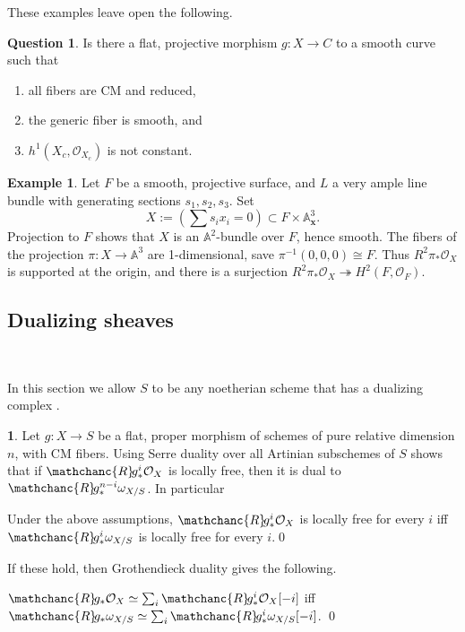 \documentclass{amsart}
\theoremstyle{definition}
\newtheorem{say}[thm]{}
\newtheorem{exmp}[thm]{Example}
\newtheorem{ques}[thm]{Question}    %
\theoremstyle{remark}
\renewcommand{\o}[0]{{\mathcal O}}
\renewcommand{\a}[0]{{\mathbb A}}
\newcommand{\onto}[0]{\twoheadrightarrow}
\newcommand{\tsum}[0]{\textstyle{\sum}}
\newcommand{\myR}{{\mathchanc{R}\!}}
\begin{document}
 
 These examples leave open the following.

 \begin{ques} Is there a flat, projective morphism
   $g:X\to C$ to a smooth curve such that
   \begin{enumerate}
   \item all fibers are  CM and reduced,
   \item the generic fiber is smooth, and
   \item  $h^1(X_c, \o_{X_c})$ is not constant.
   \end{enumerate}
   \end{ques}



 \begin{exmp}\label{h2.tor.exmp} Let $F$ be a smooth, projective surface, and $L$ a very ample line bundle with generating sections $s_1, s_2, s_3$.
   Set $$
   X:=(\tsum s_ix_i=0)\subset F\times \a^3_{\mathbf x}.
   $$
   Projection to $F$ shows that $X$ is an $\a^2$-bundle over $F$, hence smooth.   The fibers of the projection $\pi:X\to \a^3$ are 1-dimensional, save $\pi^{-1}(0,0,0)\cong F$.   Thus  $R^2\pi_*\o_X$ is supported at the origin, and there is a surjection $R^2\pi_*\o_X\onto H^2(F, \o_F)$.
 \end{exmp}






 \subsection*{Dualizing sheaves}{\ }
 \medskip


  In this section  we allow
 $S$ to be any noetherian scheme that has a dualizing complex
 \cite[\href{https://stacks.math.columbia.edu/tag/0A7B}{Tag
    0A7B}]{stacks-project}.


 \begin{say}\label{dual.elem.say}
   Let $g:X\to S$ be a flat, proper  morphism of schemes of pure relative dimension $n$, 
   with CM fibers.  Using Serre duality  over all Artinian subschemes of $S$ shows that if $\myR g^i_*\o_X$ is locally free, then it is dual to
   $\myR g^{n-i}_*\omega_{X/S}$. In particular
   \medskip

     Under the above assumptions, $\myR g^i_*\o_X$ is locally free for every $i$ iff $\myR g^{i}_*\omega_{X/S}$ is locally free for every $i$.\qed
   \medskip

   If these hold, then Grothendieck duality gives the following.
     \medskip

     $\myR g_*\o_X\simeq \sum_i\myR g^i_*\o_X[-i]$  iff $\myR g_*\omega_{X/S}\simeq \sum_i\myR g^i_*\omega_{X/S}[-i]$. \qed
 \end{say}
\end{document}
